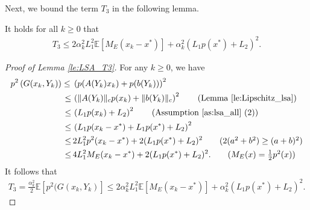 \documentclass[11 pt]{article}
\begin{document}
	Next, we bound the term $T_3$ in the following lemma.
	
	\begin{lemma}\label{le:LSA_T3}
		It holds for all $k\geq 0$ that
		\begin{align*}
			T_3 \leq 2\alpha_k^2L_1^2\mathbb{E}[M_E(x_k-x^*)]+\alpha_k^2(L_1p(x^*)+L_2)^2.
		\end{align*}
	\end{lemma}
	\begin{proof}[Proof of Lemma \ref{le:LSA_T3}]
		For any $k\geq 0$, we have
		\begin{align*}
			p^2\left(G(x_k,Y_k)\right)
			\leq \;& \left(p(A(Y_k)x_k)+p(b(Y_k))\right)^2\\
			\leq \,&\left(\|A(Y_k)\|_cp(x_k)+\|b(Y_k)\|_c\right)^2\tag{Lemma \ref{le:Lipschitz_lsa}}\\
			\leq \,&\left(L_1p(x_k)+L_2\right)^2\tag{Assumption \ref{as:lsa_all} (2)}\\
			\leq \,&\left(L_1p(x_k-x^*)+L_1p(x^*)+L_2\right)^2\\
			\leq \,&2L_1^2p^2(x_k-x^*)+2(L_1p(x^*)+L_2)^2\tag{$2(a^2+b^2)\geq (a+b)^2$}\\
			\leq \,&4L_1^2M_E(x_k-x^*)+2(L_1p(x^*)+L_2)^2.\tag{$M_E(x)=\frac{1}{2}p^2(x)$}
		\end{align*}
		It follows that 
		\begin{align*}
			T_3=\frac{\alpha_k^2}{2}\mathbb{E}[p^2(G(x_k,Y_k)]\leq 2\alpha_k^2L_1^2\mathbb{E}[M_E(x_k-x^*)]+\alpha_k^2(L_1p(x^*)+L_2)^2.
		\end{align*}
	\end{proof}
	
	
	
\end{document}
